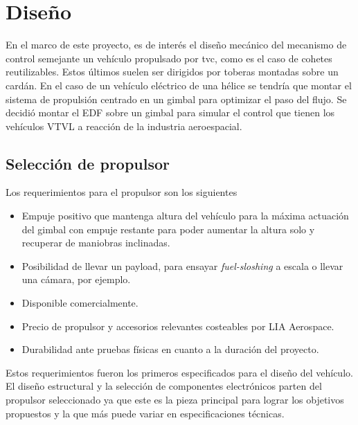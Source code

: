 \section{Diseño}

En el marco de este proyecto, es de interés el diseño mecánico del mecanismo de control semejante un vehículo propulsado por \gls{tvc}, como es el caso de cohetes reutilizables. Estos últimos suelen ser dirigidos por toberas montadas sobre un cardán. En el caso de un vehículo eléctrico de una hélice se tendría que montar el sistema de propulsión centrado en un gimbal para optimizar el paso del flujo. Se decidió montar el EDF sobre un gimbal para simular el control que tienen los vehículos VTVL a reacción de la industria aeroespacial. 



\subsection{Selección de propulsor}

Los requerimientos para el propulsor son los siguientes

\begin{itemize}
    \item Empuje positivo que mantenga altura del vehículo para la máxima actuación del gimbal con empuje restante para poder aumentar la altura solo y recuperar de maniobras inclinadas. 
    \item Posibilidad de llevar un payload, para ensayar \textit{fuel-sloshing} a escala o llevar una cámara, por ejemplo.
    \item Disponible comercialmente.
    \item Precio de propulsor y accesorios relevantes costeables por LIA Aerospace.
    \item Durabilidad ante pruebas físicas en cuanto a la duración del proyecto.
\end{itemize}

Estos requerimientos fueron los primeros especificados para el diseño del vehículo. El diseño estructural y la selección de componentes electrónicos parten del propulsor seleccionado ya que este es la pieza principal para lograr los objetivos propuestos y la que más puede variar en especificaciones técnicas.

\medskip 

